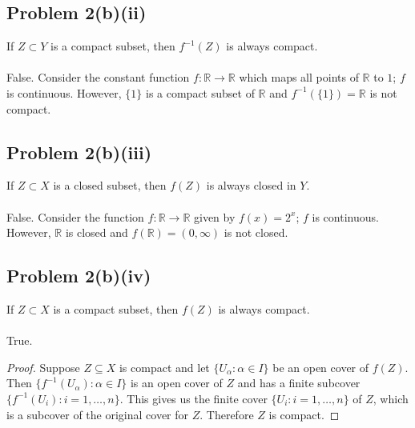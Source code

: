 \documentclass[12pt]{article}
\newenvironment{problem}
    {\begin{lrbox}{\mybox}\begin{minipage}{\textwidth-10pt}}
    {\end{minipage}\end{lrbox}\framebox[6.5in]{\usebox{\mybox}}}
\newenvironment{response}{\paragraph{}}{}
\newcommand{\R}{\mathbb{R}}
\begin{document}
\subsection*{Problem 2(b)(ii)}
\begin{problem}
    If $Z\subset Y$ is a compact subset, then $f^{-1}(Z)$ is always compact.
\end{problem}

\begin{response}
    False. Consider the constant function $f:\R\to\R$ which maps all points of $\R$ to $1$; $f$ is continuous. However, $\{1\}$ is a compact subset of $\R$ and $f^{-1}(\{1\})=\R$ is not compact.
\end{response}

\subsection*{Problem 2(b)(iii)}
\begin{problem}
    If $Z\subset X$ is a closed subset, then $f(Z)$ is always closed in $Y$.
\end{problem}

\begin{response}
    False. Consider the function $f:\R\to \R$ given by $f(x)=2^x$; $f$ is continuous. However, $\R$ is closed and $f(\R)=(0,\infty)$ is not closed. 
\end{response}

\subsection*{Problem 2(b)(iv)}
\begin{problem}
    If $Z\subset X$ is a compact subset, then $f(Z)$ is always compact.
\end{problem}

\begin{response}
    True.
\end{response}

\begin{proof}
    Suppose $Z\subseteq X$ is compact and let $\{U_\alpha : \alpha\in I\}$ be an open cover of $f(Z)$. Then $\{f^{-1}(U_\alpha) : \alpha \in I\}$ is an open cover of $Z$ and has a finite subcover $\{f^{-1}(U_i) : i=1,\dots,n\}$. This gives us the finite cover $\{U_i : i=1,\dots,n\}$ of $Z$, which is a subcover of the original cover for $Z$. Therefore $Z$ is compact.
    
\end{proof}
\end{document}
